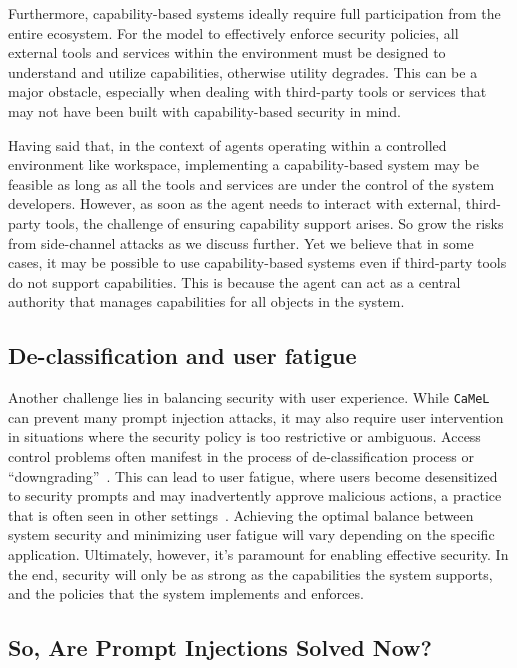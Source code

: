 \documentclass[11pt, a4paper, logo, copyright]{googledeepmind}
\newcommand{\sysname}{\texttt{CaMeL}\xspace}
\begin{document}
Furthermore, capability-based systems ideally require full participation from the entire ecosystem. For the model to effectively enforce security policies, all external tools and services within the environment must be designed to understand and utilize capabilities, otherwise utility degrades. This can be a major obstacle, especially when dealing with third-party tools or services that may not have been built with capability-based security in mind.

Having said that, in the context of agents operating within a controlled environment like workspace, implementing a capability-based system may be feasible as long as all the tools and services are under the control of the system developers. However, as soon as the agent needs to interact with external, third-party tools, the challenge of ensuring capability support arises. So grow the risks from side-channel attacks as we discuss further. Yet we believe that in some cases, it may be possible to use capability-based systems even if third-party tools do not support capabilities. This is because the agent can act as a central authority that manages capabilities for all objects in the system.


\subsection{De-classification and user fatigue}

Another challenge lies in balancing security with user experience. While \sysname{} can prevent many prompt injection attacks, it may also require user intervention in situations where the security policy is too restrictive or ambiguous. Access control problems often manifest in the process of de-classification process or ``downgrading''~\citep{anderson2002security}. This can lead to user fatigue, where users become desensitized to security prompts and may inadvertently approve malicious actions, a practice that is often seen in other settings~\citep{felt2012androidpermissions,cao2021alargescalestudy}. Achieving the optimal balance between system security and minimizing user fatigue will vary depending on the specific application. Ultimately, however, it's paramount for enabling effective security. In the end, security will only be as strong as the capabilities the system supports, and the policies that the system implements and enforces.

\subsection{So, Are Prompt Injections Solved Now?}
\end{document}
